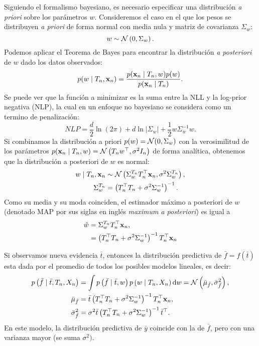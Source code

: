 Siguiendo el formalismo bayesiano, es necesario especificar una distribución \emph{a priori} sobre los parámetros \(w\). Consideremos el caso en el que los pesos se distribuyen \emph{a priori} de forma normal con media nula y matriz de covarianza \(\Sigma_{w}\):
\begin{equation*}
	w \sim \mathcal{N} \left(0, \Sigma_w\right).
\end{equation*}%
Podemos aplicar el Teorema de Bayes para encontrar la distribución \emph{a posteriori} de \(w\) dado los datos observados:
\begin{equation*}
	p(w \mid T_n, \mathbf{x}_n) = \frac{p(\mathbf{x}_n \mid T_n, w) p(w)}{p(\mathbf{x}_n \mid T_n)}.
\end{equation*}
Se puede ver que la función a minimizar es la suma entre la NLL y la log-prior negativa (NLP), la cual en un enfoque no bayesiano se considera como un termino de penalización:
\begin{equation*}
	NLP = \frac{d}{2} \ln(2\pi) + d \ln \left\vert \Sigma_w \right\vert + \frac{1}{2} w \Sigma_w^{-1} w.
\end{equation*}
Si combinamos la distribución a priori \(p(w) = \mathcal{N} (0, \Sigma_w)\) con la verosimilitud de los parámetros \(p(\mathbf{x}_n \mid T_n, w) = \mathcal{N} \left(T_n w^{\top}, \sigma^2 I_n\right)\) de forma analítica, obtenemos que la distribución a posteriori de \(w\) es normal:
\begin{align*}
	w \mid T_n, \mathbf{x}_n	&\sim \mathcal{N}\left(\Sigma_w^{T_n} T_n^{\top} \mathbf{x}_n, \sigma^2 \Sigma_w^{T_n}\right),\\
	\Sigma_w^{T_n}		&= \left(T_n^{\top} T_n + \sigma^2 \Sigma_w^{-1}\right)^{-1}.
\end{align*}
Como su media y su moda coinciden, el estimador máximo a posteriori de \(w\) (denotado MAP por sus siglas en inglés \emph{maximum a posteriori}) es igual a
\begin{align*}
	\hat{w}	&= \Sigma_w^{T_n} T_n^{\top} \mathbf{x}_n,\\
			&= \left(T_n^{\top} T_n + \sigma^2 \Sigma_w^{-1}\right)^{-1} T_n^{\top} \mathbf{x}_n
\end{align*}

Si observamos nueva evidencia \(\bar{t}\), entonces la distribución predictiva de \(\bar{f} = f(\bar{t})\) esta dada por el promedio de todos los posibles modelos lineales, es decir:
\begin{align*}
	p \left(\bar{f} \mid \bar{t}, T_n,X_n\right)	&= \int p \left(\bar{f} \mid \bar{t}, w\right) p\left(w \mid T_n, X_n\right) \dd{w} = \mathcal{N} \left(\bar{\mu}_{\bar{f}}, \bar{\sigma}_{\bar{f}}^2\right),\\
	\bar{\mu}_{\bar{f}}								&= \bar{t} \left(T_n^{\top} T_n + \sigma^2\Sigma_w^{-1}\right)^{-1} T_n^{\top} \mathbf{x}_n,\\
	\bar{\sigma}_{\bar{f}}^2						&= \sigma^2 \bar{t} \left(T_n^{\top} T_n + \sigma^2 \Sigma_w^{-1}\right)^{-1} \bar{t}^{\top}.
\end{align*}%
En este modelo, la distribución predictiva de \(\bar{y}\) coincide con la de \(\bar{f}\), pero con una varianza mayor (se suma \(\sigma^2)\).

